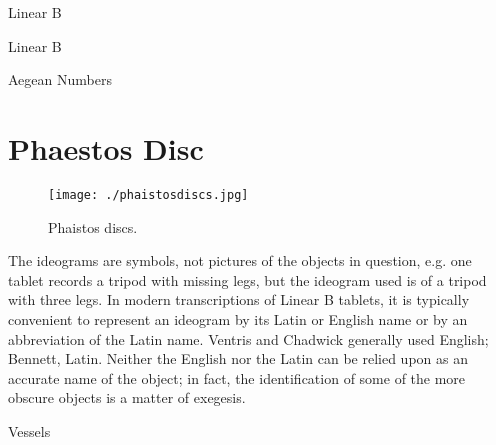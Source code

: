 \begin{scriptexample}[]{Linear B}

\end{scriptexample}

\begin{scriptexample}[]{Linear B}
\end{scriptexample}


\begin{scriptexample}[]{Aegean Numbers}

\end{scriptexample}


\section{Phaestos Disc}

\begin{figure}[htp]
\centering

\texttt{[image: ./phaistosdiscs.jpg]}
\caption{Phaistos discs.}
\end{figure}




The ideograms are symbols, not pictures of the objects in question, e.g. one tablet records a tripod with missing legs, but the ideogram used is of a tripod with three legs. In modern transcriptions of Linear B tablets, it is typically convenient to represent an ideogram by its Latin or English name or by an abbreviation of the Latin name. Ventris and Chadwick generally used English; Bennett, Latin. Neither the English nor the Latin can be relied upon as an accurate name of the object; in fact, the identification of some of the more obscure objects is a matter of exegesis.

\bgroup

\linearb

Vessels
\let\l\unicodenumber

